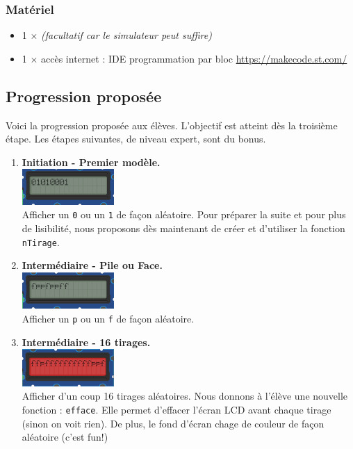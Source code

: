 \subsubsection{Matériel}
\begin{itemize}
    \item 1 $\times$ \matosSt \emph{(facultatif car le simulateur peut suffire)}
    \item 1 $\times$ accès internet : IDE programmation par bloc \url{https://makecode.st.com/}
\end{itemize}


\newpage
\subsection{Progression proposée}

\begin{methode}
Voici la progression proposée aux élèves. L'objectif est atteint dès la troisième étape. Les étapes suivantes, de niveau expert, sont du bonus.
\begin{enumerate}
    \item
        \textbf{Initiation - Premier modèle.} \\
        \includegraphics[width=3.5cm]{res/st-pf-00.png}\\Afficher un \texttt{0} ou un \texttt{1} de façon aléatoire. Pour préparer la suite et pour plus de lisibilité, nous proposons dès maintenant de créer et d'utiliser la fonction \texttt{nTirage}.
    \item 
        \textbf{Intermédiaire - Pile ou Face.}\\
        \includegraphics[width=3.5cm]{res/st-pf-01.png}\\Afficher un \texttt{p} ou un \texttt{f} de façon aléatoire.
    \item 
        \textbf{Intermédiaire - 16 tirages.}\\ 
        \includegraphics[width=3.5cm]{res/st-pf-02.png}\\Afficher d'un coup 16 tirages aléatoires. Nous donnons à l'élève une nouvelle fonction : \texttt{efface}. Elle permet d'effacer l'écran LCD avant chaque tirage (sinon on voit rien). De plus, le fond d'écran chage de couleur de façon aléatoire (c'est fun!)

\end{enumerate}
\end{methode}
